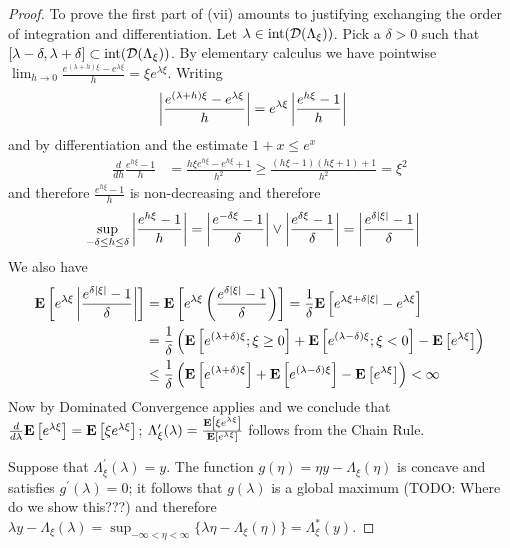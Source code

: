 \begin{proof}
To prove the first part of (vii) amounts to justifying exchanging the order of integration and differentiation.  Let $\lambda \in \operatorname*{int}(\mathcal{D}(\Lambda_\xi))$.  Pick a $\delta >0$ such that $[\lambda - \delta, \lambda + \delta] \subset \operatorname*{int}(\mathcal{D}(\Lambda_\xi))$.  By elementary calculus we have pointwise $\lim_{h \to 0} \frac{e^{(\lambda + h) \xi} - e^{\lambda \xi}}{h} = \xi e^{\lambda \xi}$.  Writing 
\begin{align*}
\left \vert \frac{e^{(\lambda + h) \xi} - e^{\lambda \xi}}{h} \right \vert &=e^{\lambda \xi}\left \vert \frac{e^{h \xi} - 1}{h} \right \vert
\end{align*}
and by differentiation and the estimate $1+x \leq e^x$
\begin{align*}
\frac{d}{dh} \frac{e^{h \xi} - 1}{h} &= \frac{h \xi e^{h \xi} - e^{h \xi} + 1}{h^2} \geq  \frac{(h \xi  -1)(h \xi + 1)+ 1}{h^2} = \xi^2
\end{align*}
and therefore $\frac{e^{h \xi} - 1}{h}$ is non-decreasing and therefore 
\begin{align*}
\sup_{-\delta \leq h \leq \delta} \left \vert \frac{e^{h \xi} - 1}{h} \right \vert &= \left \vert \frac{e^{-\delta \xi} - 1}{\delta} \right \vert  \vee \left \vert \frac{e^{\delta \xi} - 1}{\delta} \right \vert = \left \vert \frac{e^{\delta \left \vert \xi \right \vert} - 1}{\delta} \right \vert
\end{align*}
We also have
\begin{align*}
\textbf{E}\left[e^{\lambda \xi}\left \vert \frac{e^{\delta \left \vert \xi \right \vert} - 1}{\delta} \right \vert\right] &=\textbf{E}\left[e^{\lambda \xi}\left( \frac{e^{\delta \left \vert \xi \right \vert} - 1}{\delta} \right)\right] =\frac{1}{\delta}\textbf{E}\left[e^{\lambda \xi + \delta \left \vert \xi \right \vert} - e^{\lambda \xi}\right] \\
&= \frac{1}{\delta} \left(\textbf{E}\left[e^{(\lambda + \delta)\xi}; \xi \geq 0\right]  + \textbf{E}\left[e^{(\lambda - \delta)\xi}; \xi < 0\right]- \textbf{E}\left[e^{\lambda \xi}\right] \right ) \\
&\leq \frac{1}{\delta} \left (\textbf{E}\left[e^{(\lambda + \delta)\xi}\right]  + \textbf{E}\left[e^{(\lambda - \delta)\xi}\right] - \textbf{E}\left[e^{\lambda \xi}\right] \right ) < \infty \\
\end{align*}
Now by Dominated Convergence applies and we conclude that $\frac{d}{d\lambda} \textbf{E}\left[e^{\lambda \xi}\right] = \textbf{E}\left[\xi e^{\lambda \xi}\right]$;  $\Lambda_\xi^\prime(\lambda) = \frac{\textbf{E}\left[\xi e^{\lambda \xi}\right]}{\textbf{E}\left[e^{\lambda \xi}\right]}$ follows from the Chain Rule.

Suppose that $\Lambda_\xi^\prime(\lambda) = y$.  The function $g(\eta) = \eta y - \Lambda_\xi(\eta)$ is concave and satisfies $g^\prime(\lambda) = 0$; it follows that $g(\lambda)$ is a global maximum (TODO: Where do we show this???) and therefore $\lambda y - \Lambda_\xi(\lambda) = \sup_{-\infty < \eta < \infty} \lbrace \lambda \eta - \Lambda_\xi(\eta)\rbrace = \Lambda_\xi^*(y)$.
\end{proof}

